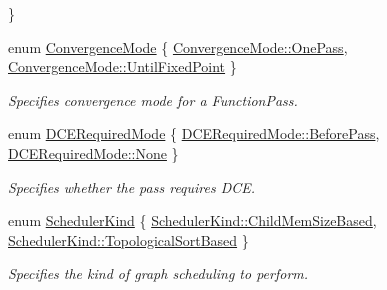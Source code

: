 \begin{DoxyCompactItemize}
 \}
\item 
enum \hyperlink{namespaceglow_a56845b9c860fa69d01d2084361d7c1f0}{Convergence\+Mode} \{ \hyperlink{namespaceglow_a56845b9c860fa69d01d2084361d7c1f0accd4cef52fe08da3eeac0e4396a2aca2}{Convergence\+Mode\+::\+One\+Pass}, 
\hyperlink{namespaceglow_a56845b9c860fa69d01d2084361d7c1f0a1a3fe1603e0a452b098a101b7d833f87}{Convergence\+Mode\+::\+Until\+Fixed\+Point}
 \}\begin{DoxyCompactList}\small\item\em Specifies convergence mode for a Function\+Pass. \end{DoxyCompactList}
\item 
enum \hyperlink{namespaceglow_a6b85539f22b3e3292adf202254f0da1e}{D\+C\+E\+Required\+Mode} \{ \hyperlink{namespaceglow_a6b85539f22b3e3292adf202254f0da1eaff7ad7af6ac42e36a5d538e74cde072d}{D\+C\+E\+Required\+Mode\+::\+Before\+Pass}, 
\hyperlink{namespaceglow_a6b85539f22b3e3292adf202254f0da1ea6adf97f83acf6453d4a6a4b1070f3754}{D\+C\+E\+Required\+Mode\+::\+None}
 \}\begin{DoxyCompactList}\small\item\em Specifies whether the pass requires D\+CE. \end{DoxyCompactList}
\item 
enum \hyperlink{namespaceglow_af5b11a9c44f948717d6a886891a58b11}{Scheduler\+Kind} \{ \hyperlink{namespaceglow_af5b11a9c44f948717d6a886891a58b11aca8f7fd5d3a60fdbaaa2f584621c7759}{Scheduler\+Kind\+::\+Child\+Mem\+Size\+Based}, 
\hyperlink{namespaceglow_af5b11a9c44f948717d6a886891a58b11afc2c746e636936c8ce50270012da3147}{Scheduler\+Kind\+::\+Topological\+Sort\+Based}
 \}\begin{DoxyCompactList}\small\item\em Specifies the kind of graph scheduling to perform. \end{DoxyCompactList}
\end{DoxyCompactItemize}
